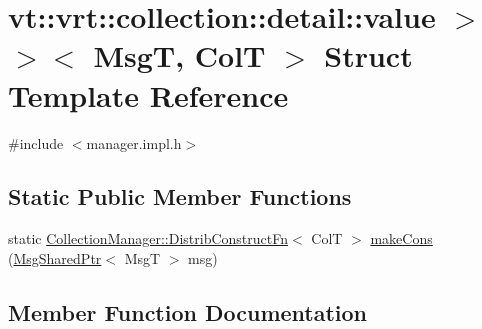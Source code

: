 \hypertarget{structvt_1_1vrt_1_1collection_1_1detail_1_1_insert_msg_dispatcher_3_01_msg_t_00_01_col_t_00_01st63328b77cb25348343d0eb4c4a2955e0}{}\section{vt\+:\+:vrt\+:\+:collection\+:\+:detail\+:\+:value $>$$>$$<$ MsgT, ColT $>$ Struct Template Reference}
\label{structvt_1_1vrt_1_1collection_1_1detail_1_1_insert_msg_dispatcher_3_01_msg_t_00_01_col_t_00_01st63328b77cb25348343d0eb4c4a2955e0}


{\ttfamily \#include $<$manager.\+impl.\+h$>$}

\subsection*{Static Public Member Functions}
\begin{DoxyCompactItemize}
\item 
static \hyperlink{structvt_1_1vrt_1_1collection_1_1_collection_manager_a7503830bc133013d542856fa39834dcc}{Collection\+Manager\+::\+Distrib\+Construct\+Fn}$<$ ColT $>$ \hyperlink{structvt_1_1vrt_1_1collection_1_1detail_1_1_insert_msg_dispatcher_3_01_msg_t_00_01_col_t_00_01st63328b77cb25348343d0eb4c4a2955e0_a9a3fead2e25e2b6be20c8875fbb0026f}{make\+Cons} (\hyperlink{namespacevt_ab2b3d506ec8e8d1540aede826d84a239}{Msg\+Shared\+Ptr}$<$ MsgT $>$ msg)
\end{DoxyCompactItemize}


\subsection{Member Function Documentation}
\mbox{\label{structvt_1_1vrt_1_1collection_1_1detail_1_1_insert_msg_dispatcher_3_01_msg_t_00_01_col_t_00_01st63328b77cb25348343d0eb4c4a2955e0_a9a3fead2e25e2b6be20c8875fbb0026f}} 

